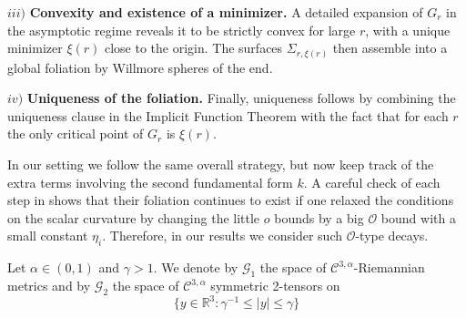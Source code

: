 \documentclass[12pt,a4paper]{amsart}
\theoremstyle{plain}
\theoremstyle{definition}
\begin{document}
$iii)$ \textbf{Convexity and existence of a minimizer.} 
    A detailed expansion of \(G_r\) in the asymptotic regime reveals it to be strictly convex for large \(r\), with a unique minimizer \(\xi(r)\) close to the origin.  The surfaces \(\Sigma_{r,\xi(r)}\) then assemble into a global foliation by Willmore spheres of the end.

$iv)$ \textbf{Uniqueness of the foliation.} 
    Finally, uniqueness follows by combining the uniqueness clause in the Implicit Function Theorem with the fact that for each \(r\) the only critical point of \(G_r\) is \(\xi(r)\).



In our setting we follow the same overall strategy, but now keep track of the extra terms involving the second fundamental form $k$.  A careful check of each step in \cite{eichko} shows that their foliation continues to exist   if one relaxed  the conditions on the scalar curvature by changing the little $o$ bounds by a big $\mathcal{O}$ bound with a small constant $\eta_i$.  Therefore, in our results  we consider such  $\mathcal{O}$-type decays.    





Let $\alpha \in (0, 1)$ and $\gamma > 1$. We denote by $\mathcal{G}_1$ the space of $\mathcal{C}^{3,\alpha}$-Riemannian metrics and by $\mathcal{G}_2$ the space of $\mathcal{C}^{3,\alpha}$ symmetric 2-tensors on
$$\{y \in \mathbb{R}^3: \gamma^{-1} \leq |y| \leq \gamma\}$$
\end{document}
